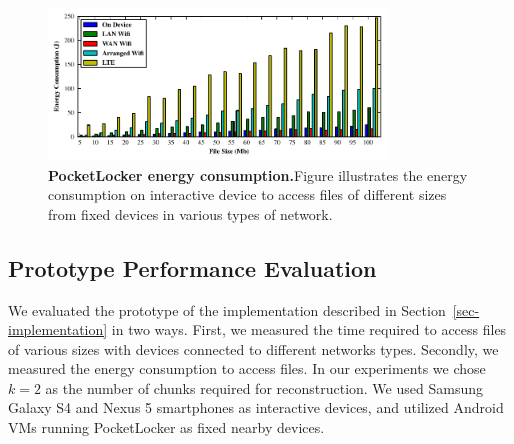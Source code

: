\begin{figure}[t]
  \centering
  \includegraphics[width=0.8\textwidth]{./figures/energyconsumption.pdf}
  
  \vspace*{-0.1in}

  \caption{\small \textbf{PocketLocker energy consumption.}Figure illustrates the energy
  consumption on interactive device to access files of different sizes from
fixed devices in various types of network.}

  \label{fig-evaluation-energy}
  
  \vspace*{0.05in}


  \vspace*{-0.2in}

\end{figure}
\subsection{Prototype Performance Evaluation}

We evaluated the prototype of the implementation described in
Section~\ref{sec-implementation} in two ways. First, we measured the time
required to access files of various sizes with devices connected to different
networks types. Secondly, we measured the energy consumption to access files.
In our experiments we chose $k=2$ as the number of chunks required for
reconstruction. We used Samsung Galaxy S4 and Nexus 5 smartphones as
interactive devices, and utilized Android VMs running PocketLocker as fixed
nearby devices.

